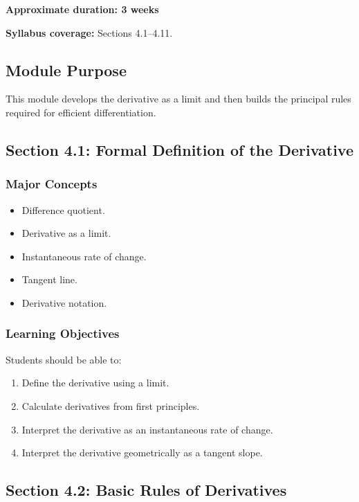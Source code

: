 \documentclass[11pt]{article}
\begin{document}
\textbf{Approximate duration: 3 weeks}

\textbf{Syllabus coverage:} Sections 4.1--4.11.

\subsection{Module Purpose}

This module develops the derivative as a limit and then builds the principal
rules required for efficient differentiation.

\subsection{Section 4.1: Formal Definition of the Derivative}

\subsubsection{Major Concepts}

\begin{itemize}
    \item Difference quotient.
    \item Derivative as a limit.
    \item Instantaneous rate of change.
    \item Tangent line.
    \item Derivative notation.
\end{itemize}

\subsubsection{Learning Objectives}

Students should be able to:

\begin{enumerate}
    \item Define the derivative using a limit.
    \item Calculate derivatives from first principles.
    \item Interpret the derivative as an instantaneous rate of change.
    \item Interpret the derivative geometrically as a tangent slope.
\end{enumerate}

\subsection{Section 4.2: Basic Rules of Derivatives}
\end{document}
